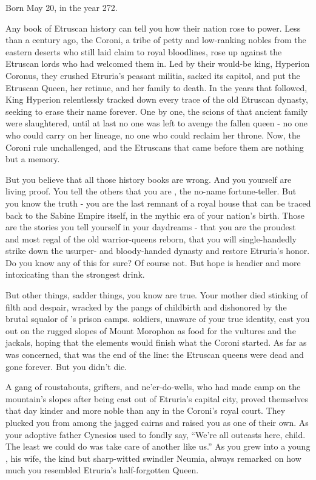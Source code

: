 \documentclass[char]{Kos}
\begin{document}
\name{\cBurglar{}}

Born May 20, in the year 272.

    Any book of Etruscan history can tell you how their nation rose to power. Less than a century ago, the Coroni, a tribe of petty and low-ranking nobles from the eastern deserts who still laid claim to royal bloodlines, rose up against the Etruscan lords who had welcomed them in. Led by their would-be king, Hyperion Coronus, they crushed Etruria's peasant militia, sacked its capitol, and put the Etruscan Queen, her retinue, and her family to death. In the years that followed, King Hyperion relentlessly tracked down every trace of the old Etruscan dynasty, seeking to erase their name forever. One by one, the scions of that ancient family were slaughtered, until at last no one was left to avenge the fallen queen - no one who could carry on her lineage, no one who could reclaim her throne. Now, the Coroni rule unchallenged, and the Etruscans that came before them are nothing but a memory. 

    But you believe that all those history books are wrong. And you yourself are living proof. You tell the others that you are \cBurglar{}, the no-name fortune-teller. But you know the truth - you are the last remnant of a royal house that can be traced back to the Sabine Empire itself, in the mythic era of your nation's birth. Those are the stories you tell yourself in your daydreams - that you are the proudest and most regal of the old warrior-queens reborn, that you will single-handedly strike down \cEtruriaKing{} the usurper-\cEtruriaKing{\monarch} and \cEtruriaKing{\their} bloody-handed dynasty and restore Etruria's honor. Do you know any of this for sure? Of course not. But hope is headier and more intoxicating than the strongest drink.

    But other things, sadder things, you know are true. Your mother died stinking of filth and despair, wracked by the pangs of childbirth and dishonored by the brutal squalor of \cEtruriaKing{\Monarch} \cEtruriaKing{}'s prison camps. \cEtruriaKing{\Their} soldiers, unaware of your true identity, cast you out on the rugged slopes of Mount Morophon as food for the vultures and the jackals, hoping that the elements would finish what the Coroni started. As far as \cEtruriaKing{\Monarch} \cEtruriaKing{} was concerned, that was the end of the line: the Etruscan queens were dead and gone forever. But you didn't die. 

    A gang of roustabouts, grifters, and ne'er-do-wells, who had made camp on the mountain's slopes after being cast out of Etruria's capital city, proved themselves that day kinder and more noble than any in the Coroni's royal court. They plucked you from among the jagged cairns and raised you as one of their own. As your adoptive father Cynesios used to fondly say, ``We're all outcasts here, child. The least we could do was take care of another like us.'' As you grew into a young \cBurglar{\human}, his wife, the kind but sharp-witted swindler Neumia, always remarked on how much you resembled Etruria's half-forgotten Queen. 
\end{document}
